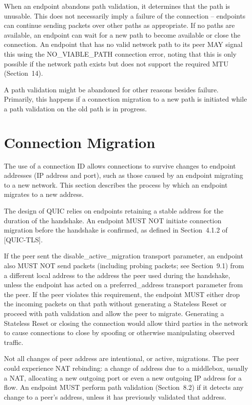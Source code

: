 \documentclass{article}
\begin{document}
When an endpoint abandons path validation, it determines that the path is unusable.  This does not necessarily imply a failure of the connection -- endpoints can continue sending packets over other paths as appropriate.  If no paths are available, an endpoint can wait for a new path to become available or close the connection.  An endpoint that has no valid network path to its peer MAY signal this using the NO\_VIABLE\_PATH connection error, noting that this is only possible if the network path exists but does not support the required MTU (Section~14).

A path validation might be abandoned for other reasons besides failure.  Primarily, this happens if a connection migration to a new path is initiated while a path validation on the old path is in progress.

\section{Connection Migration}

The use of a connection ID allows connections to survive changes to endpoint addresses (IP address and port), such as those caused by an endpoint migrating to a new network.  This section describes the process by which an endpoint migrates to a new address.

The design of QUIC relies on endpoints retaining a stable address for the duration of the handshake.  An endpoint MUST NOT initiate connection migration before the handshake is confirmed, as defined in Section~4.1.2 of [QUIC-TLS].

If the peer sent the disable\_active\_migration transport parameter, an endpoint also MUST NOT send packets (including probing packets; see Section~9.1) from a different local address to the address the peer used during the handshake, unless the endpoint has acted on a preferred\_address transport parameter from the peer.  If the peer violates this requirement, the endpoint MUST either drop the incoming packets on that path without generating a Stateless Reset or proceed with path validation and allow the peer to migrate.  Generating a Stateless Reset or closing the connection would allow third parties in the network to cause connections to close by spoofing or otherwise manipulating observed traffic.

Not all changes of peer address are intentional, or active, migrations.  The peer could experience NAT rebinding: a change of address due to a middlebox, usually a NAT, allocating a new outgoing port or even a new outgoing IP address for a flow.  An endpoint MUST perform path validation (Section~8.2) if it detects any change to a peer's address, unless it has previously validated that address.
\end{document}
